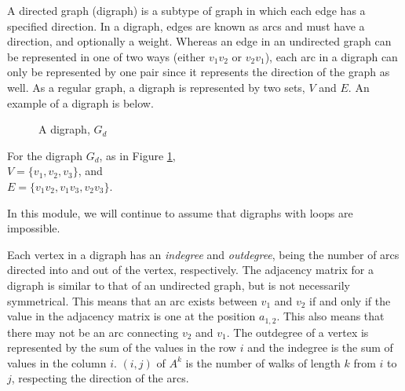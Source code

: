 
A directed graph (digraph) is a subtype of graph in which each edge has a specified direction. In a digraph, edges are
 known as arcs and must have a direction, and optionally a weight. Whereas an edge in an undirected graph can be
 represented in one of two ways (either $v_1v_2$ or $v_2v_1$), each arc in a digraph can only be represented by one pair
 since it represents the direction of the graph as well. As a regular graph, a digraph is represented by two sets, $V$
 and $E$. An example of a digraph is below.

\begin{minipage}[c]{0.45\linewidth}
  \begin{figure}[H]
    \centering
    \usetikzlibrary{graphs}
    \caption{A digraph, $G_d$}
    \label{fig:digraph1}
  \end{figure}
\end{minipage}\hfill
\begin{minipage}[c]{0.45\linewidth}
  For the digraph $G_d$, as in Figure \ref*{fig:digraph1},\\
  $V = \{v_1, v_2, v_3\}$, and\\
  $E = \{v_1v_2, v_1v_3, v_2v_3\}$.
\end{minipage}

In this module, we will continue to assume that digraphs with loops are impossible.

Each vertex in a digraph has an \textit{indegree} and \textit{outdegree}, being the number of arcs directed into and out
 of the vertex, respectively. The adjacency matrix for a digraph is similar to that of an undirected graph, but is not
 necessarily symmetrical. This means that an arc exists between $v_1$ and $v_2$ if and only if the value in the adjacency
 matrix is one at the position $a_{1,2}$. This also means that there may not be an arc connecting $v_2$ and $v_1$. The
 outdegree of a vertex is represented by the sum of the values in the row $i$ and the indegree is the sum of values in
 the column $i$. $(i, j)$ of $A^k$ is the number of walks of length $k$ from $i$ to $j$, respecting the direction of the
 arcs.

